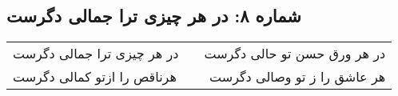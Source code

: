 \begin{center}
\section*{شماره ۸: در هر چیزی ترا جمالی دگرست}
\label{sec:008}
\begin{longtable}{l p{0.5cm} r}
در هر چیزی ترا جمالی دگرست
&&
در هر ورق حسن تو حالی دگرست
\\
هرناقص را ازتو کمالی دگرست
&&
هر عاشق را ز تو وصالی دگرست
\\
\end{longtable}
\end{center}
